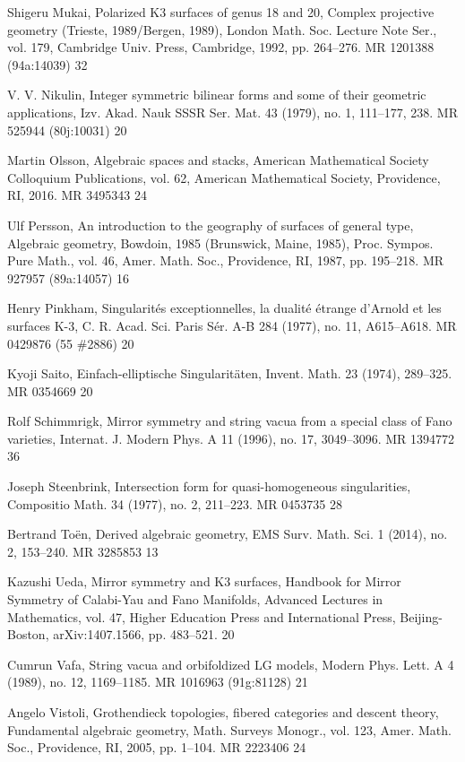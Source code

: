 {\begin{list}{}{%
  \setlength{\leftmargin}{3.8em}%
  \setlength{\itemindent}{-3.8em}%
  \setlength{\itemsep}{1.5pt}%
  \setlength{\parsep}{0pt}%
  \setlength{\listparindent}{0pt}%
}
\item[{[Muk92]}] Shigeru Mukai, Polarized K3 surfaces of genus 18 and 20, Complex projective geometry (Trieste, 1989/Bergen, 1989), London Math. Soc. Lecture Note Ser., vol. 179, Cambridge Univ. Press, Cambridge, 1992, pp. 264--276. MR 1201388 (94a:14039) 32
\item[{[Nik79]}] V. V. Nikulin, Integer symmetric bilinear forms and some of their geometric applications, Izv. Akad. Nauk SSSR Ser. Mat. 43 (1979), no. 1, 111--177, 238. MR 525944 (80j:10031) 20
\item[{[Ols16]}] Martin Olsson, Algebraic spaces and stacks, American Mathematical Society Colloquium Publications, vol. 62, American Mathematical Society, Providence, RI, 2016. MR 3495343 24
\item[{[Per87]}] Ulf Persson, An introduction to the geography of surfaces of general type, Algebraic geometry, Bowdoin, 1985 (Brunswick, Maine, 1985), Proc. Sympos. Pure Math., vol. 46, Amer. Math. Soc., Providence, RI, 1987, pp. 195--218. MR 927957 (89a:14057) 16
\item[{[Pin77]}] Henry Pinkham, Singularités exceptionnelles, la dualité étrange d’Arnold et les surfaces K-3, C. R. Acad. Sci. Paris Sér. A-B 284 (1977), no. 11, A615--A618. MR 0429876 (55 \#2886) 20
\item[{[Sai74]}] Kyoji Saito, Einfach-elliptische Singularitäten, Invent. Math. 23 (1974), 289--325. MR 0354669 20
\item[{[Sch96]}] Rolf Schimmrigk, Mirror symmetry and string vacua from a special class of Fano varieties, Internat. J. Modern Phys. A 11 (1996), no. 17, 3049--3096. MR 1394772 36
\item[{[Ste77]}] Joseph Steenbrink, Intersection form for quasi-homogeneous singularities, Compositio Math. 34 (1977), no. 2, 211--223. MR 0453735 28
\item[{[Toë14]}] Bertrand Toën, Derived algebraic geometry, EMS Surv. Math. Sci. 1 (2014), no. 2, 153--240. MR 3285853 13
\item[{[Ued]}] Kazushi Ueda, Mirror symmetry and K3 surfaces, Handbook for Mirror Symmetry of Calabi-Yau and Fano Manifolds, Advanced Lectures in Mathematics, vol. 47, Higher Education Press and International Press, Beijing-Boston, arXiv:1407.1566, pp. 483--521. 20
\item[{[Vaf89]}] Cumrun Vafa, String vacua and orbifoldized LG models, Modern Phys. Lett. A 4 (1989), no. 12, 1169--1185. MR 1016963 (91g:81128) 21
\item[{[Vis05]}] Angelo Vistoli, Grothendieck topologies, fibered categories and descent theory, Fundamental algebraic geometry, Math. Surveys Monogr., vol. 123, Amer. Math. Soc., Providence, RI, 2005, pp. 1--104. MR 2223406 24

\end{list}}
